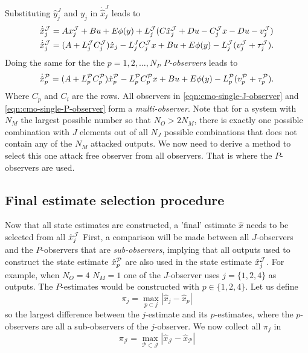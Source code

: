 Substituting $\hat{y}_j^J$ and $y_j$ in $\dot{\hat{x}}_j^J$ leads to
\begin{equation}\label{eqn:cmo-single-J-observer}
    \begin{split}
        \dot{\hat{x}}_j^{\mathcal{J}} &= Ax_j^{\mathcal{J}} + Bu + E\phi(y) + L_j^{\mathcal{J}}(C\hat{x}_j^{\mathcal{J}} + Du - C_j^{\mathcal{J}}x - Du - v_j^{\mathcal{J}}) \\
        \dot{\hat{x}}_j^{\mathcal{J}} &= (A + L_j^{\mathcal{J}}C_j^{\mathcal{J}})\hat{x}_j - L_j^JC_j^{\mathcal{J}}x + Bu + E\phi(y) - L_j^{\mathcal{J}}(v_j^{\mathcal{J}} + \tau_j^{\mathcal{J}}). \\
    \end{split}    
\end{equation}
Doing the same for the the $p=1,2,\dots,N_P$ $P$\textit{-observers} leads to
\begin{equation}\label{eqn:cmo-single-P-observer}
    \dot{\hat{x}}_p^{\mathcal{P}} = (A + L_p^{\mathcal{P}}C_p^{\mathcal{P}})\hat{x}_p^{\mathcal{P}} - L_p^{\mathcal{P}}C_p^{\mathcal{P}}x + Bu + E\phi(y) - L_p^{\mathcal{P}}(v_p^{\mathcal{P}} + \tau_p^{\mathcal{P}}).
\end{equation}
Where $C_p$ and $C_i$ are the rows. All observers in \eqref{eqn:cmo-single-J-observer} and \eqref{eqn:cmo-single-P-observer} form a \textit{multi-observer}. Note that for a system with $N_M$ the largest possible number so that $N_O > 2N_M$, there is exactly one possible combination with $J$ elements out of all $N_J$ possible combinations that does not contain any of the $N_M$ attacked outputs. We now need to derive a method to select this one attack free observer from all observers. That is where the $P$-observers are used.

\subsection{Final estimate selection procedure}
\label{subsec:estimate-selection}
Now that all state estimates are constructed, a 'final' estimate $\hat{x}$ needs to be selected from all $\hat{x}_j^{\mathcal{J}}$ First, a comparison will be made between all $J$-observers and the $P$-observers that are \textit{sub-observers}, implying that all outputs used to construct the state estimate $\hat{x}_p^{\mathcal{P}}$ are also used in the state estimate $\hat{x}_j^{\mathcal{J}}$. For example, when $N_O=4$ $N_M=1$ one of the $J$-observer uses $j=\{1,2,4\}$ as outputs. The $P$-estimates would be constructed with $p \in \{1,2,4\}$. Let us define 
\begin{equation*}
   \pi_{j} = \max_{p \subset j} |\hat{x}_{j} - \hat{x}_{p}|
\end{equation*}
so the largest difference between the $j$-estimate and its $p$-estimates, where the $p$-observers are all a sub-observers of the $j$-observer. We now collect all $\pi_j$ in
\begin{equation*}
   \pi_{\mathcal{J}} = \max_{\mathcal{P} \subset \mathcal{J}} |\hat{x}_{\mathcal{J}} - \hat{x}_{\mathcal{P}}|
\end{equation*}

